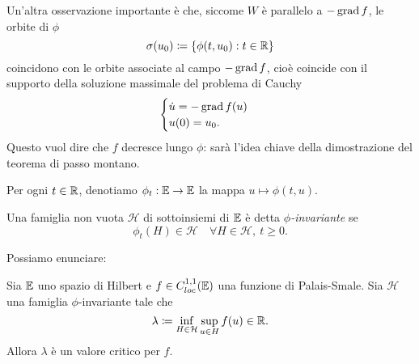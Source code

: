 	Un'altra osservazione importante è che, siccome \(W\) è parallelo a \(-\operatorname{grad} f\), le orbite di \(\phi\) 
	\[
	\sigma(u_0) \coloneq \{\phi(t,u_0) : t \in \mathbb{R}\}
	\]
	coincidono con le orbite associate al campo \(-\operatorname{grad} f\), cioè coincide con il supporto della soluzione massimale del problema di Cauchy
	\[
	\begin{cases}
		\dot u = -\operatorname{grad} f(u) \\
		u(0) = u_0.
	\end{cases}
	\]
	Questo vuol dire che \(f\) decresce lungo \(\phi\): sarà l'idea chiave della dimostrazione del teorema di passo montano. 
	
	Per ogni \(t \in \mathbb{R}\), denotiamo \(\phi_t : \mathbb{E}\to \mathbb{E}\) la mappa \(u \mapsto \phi(t,u)\).
	
	\begin{defi}
		Una famiglia non vuota \(\mathcal{H}\) di sottoinsiemi di \(\mathbb{E}\) è detta \textit{\(\phi\)-invariante} se 
		\[
		\phi_t(H) \in \mathcal{H} \quad \forall H \in \mathcal{H}, \ t \geq 0.
		\]
	\end{defi}
	
	Possiamo enunciare:
	\begin{teo}\label{teo: MP}
		Sia \(\mathbb{E}\) uno spazio di Hilbert e \(f \in C^{1,1}_{loc}(\mathbb{E})\) una funzione di Palais-Smale. Sia \(\mathcal{H}\) una famiglia \(\phi\)-invariante tale che
		\[
		\lambda \coloneq \inf_{H \in \mathcal{H}} \sup_{u \in H} f(u) \in \mathbb{R}.
		\]
		Allora \(\lambda\) è un valore critico per \(f\). 
	\end{teo}
	
